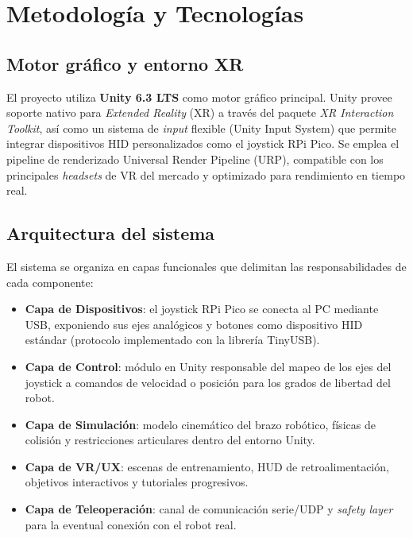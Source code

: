 
\section{Metodología y Tecnologías}

\subsection{Motor gráfico y entorno XR}

El proyecto utiliza \textbf{Unity 6.3 LTS} como motor gráfico principal. Unity provee soporte nativo para \textit{Extended Reality} (XR) a través del paquete \textit{XR Interaction Toolkit}, así como un sistema de \textit{input} flexible (Unity Input System) que permite integrar dispositivos HID personalizados como el joystick RPi Pico. Se emplea el pipeline de renderizado Universal Render Pipeline (URP), compatible con los principales \textit{headsets} de VR del mercado y optimizado para rendimiento en tiempo real.

\subsection{Arquitectura del sistema}

El sistema se organiza en capas funcionales que delimitan las responsabilidades de cada componente:

\begin{itemize}
    \item \textbf{Capa de Dispositivos}: el joystick RPi Pico se conecta al PC mediante USB, exponiendo sus ejes analógicos y botones como dispositivo HID estándar (protocolo implementado con la librería TinyUSB).
    \item \textbf{Capa de Control}: módulo en Unity responsable del mapeo de los ejes del joystick a comandos de velocidad o posición para los grados de libertad del robot.
    \item \textbf{Capa de Simulación}: modelo cinemático del brazo robótico, físicas de colisión y restricciones articulares dentro del entorno Unity.
    \item \textbf{Capa de VR/UX}: escenas de entrenamiento, HUD de retroalimentación, objetivos interactivos y tutoriales progresivos.
    \item \textbf{Capa de Teleoperación}: canal de comunicación serie/UDP y \textit{safety layer} para la eventual conexión con el robot real.
\end{itemize}

